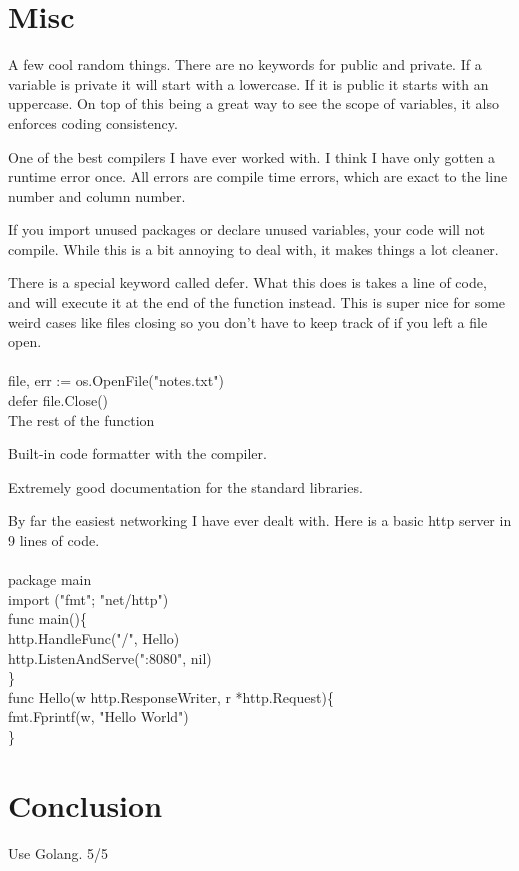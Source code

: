 \documentclass[12pt]{article}
\newcommand{\quest}[1]{\textcolor{dank}{#1}}
\newcommand{\ta}[0]{\hspace*{5mm}}
\begin{document}
\section{Misc}
\par A few cool random things. There are no keywords for public and private. If a variable is private it will start with a lowercase. If it is public it starts with an uppercase. On top of this being a great way to see the scope of variables, it also enforces coding consistency. \\
\par One of the best compilers I have ever worked with. I think I have only gotten a runtime error once. All errors are compile time errors, which are exact to the line number and column number. \\
\par If you import unused packages or declare unused variables, your code will not compile. While this is a bit annoying to deal with, it makes things a lot cleaner. \\
\par There is a special keyword called \quest{defer}. What this does is takes a line of code, and will execute it at the end of the function instead. This is super nice for some weird cases like files closing so you don't have to keep track of if you left a file open.\\\\
\quest{
file, err := os.OpenFile("notes.txt")\\
defer file.Close()\\
The rest of the function\\
}
\par Built-in code formatter with the compiler. 
\par Extremely good documentation for the standard libraries. 
\par By far the easiest networking I have ever dealt with. Here is a basic http server in 9 lines of code. \\\\
\quest{
package main\\
import ("fmt"; "net/http")\\
func main()\{\\
\ta http.HandleFunc("/", Hello)\\
\ta http.ListenAndServe(":8080", nil)\\
\}\\
func Hello(w http.ResponseWriter, r *http.Request)\{\\
\ta fmt.Fprintf(w, "Hello World")\\
\}\\
}
\section{Conclusion}
Use Golang. 5/5
\end{document}
